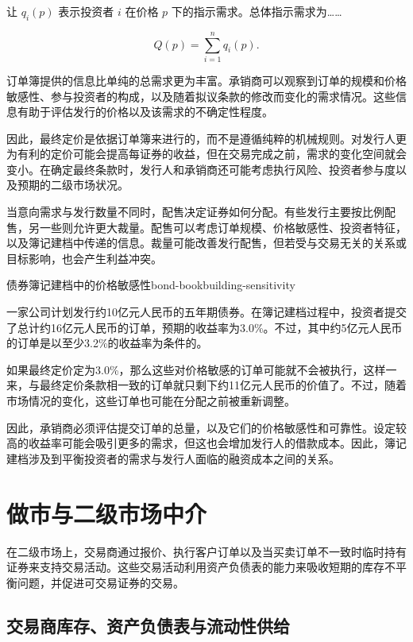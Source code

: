让 $q_i(p)$ 表示投资者 $i$ 在价格 $p$ 下的指示需求。总体指示需求为……

\begin{equation}
Q(p)=\sum_{i=1}^{n} q_i(p).
\label{eq:ch13-bookbuilding-demand}
\end{equation}

订单簿提供的信息比单纯的总需求更为丰富。承销商可以观察到订单的规模和价格敏感性、参与投资者的构成，以及随着拟议条款的修改而变化的需求情况。这些信息有助于评估发行的价格以及该需求的不确定性程度。

因此，最终定价是依据订单簿来进行的，而不是遵循纯粹的机械规则。对发行人更为有利的定价可能会提高每证券的收益，但在交易完成之前，需求的变化空间就会变小。在确定最终条款时，发行人和承销商还可能考虑执行风险、投资者参与度以及预期的二级市场状况。

当意向需求与发行数量不同时，配售决定证券如何分配。有些发行主要按比例配售，另一些则允许更大裁量。配售可以考虑订单规模、价格敏感性、投资者特征，以及簿记建档中传递的信息。裁量可能改善发行配售，但若受与交易无关的关系或目标影响，也会产生利益冲突。

\begin{example}{债券簿记建档中的价格敏感性}{bond-bookbuilding-sensitivity}

一家公司计划发行约10亿元人民币的五年期债券。在簿记建档过程中，投资者提交了总计约16亿元人民币的订单，预期的收益率为3.0\%。不过，其中约5亿元人民币的订单是以至少3.2\%的收益率为条件的。

如果最终定价定为3.0\%，那么这些对价格敏感的订单可能就不会被执行，这样一来，与最终定价条款相一致的订单就只剩下约11亿元人民币的价值了。不过，随着市场情况的变化，这些订单也可能在分配之前被重新调整。

因此，承销商必须评估提交订单的总量，以及它们的价格敏感性和可靠性。设定较高的收益率可能会吸引更多的需求，但这也会增加发行人的借款成本。因此，簿记建档涉及到平衡投资者的需求与发行人面临的融资成本之间的关系。
\end{example}

\section[做市与二级市场中介]{做市与二级市场中介}

在二级市场上，交易商通过报价、执行客户订单以及当买卖订单不一致时临时持有证券来支持交易活动。这些交易活动利用资产负债表的能力来吸收短期的库存不平衡问题，并促进可交易证券的交易。

\subsection{交易商库存、资产负债表与流动性供给}

